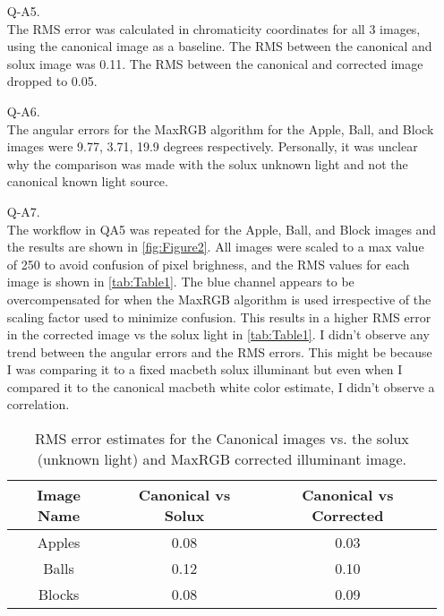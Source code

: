 \documentclass[12pt]{report}
\begin{document}
\begin{enumerate}
    \item[Q-A5.]
    \ \\
    The RMS error was calculated in chromaticity coordinates for all 3 images, using the canonical image as a baseline. The RMS between the canonical and solux 
    image was 0.11. The RMS between the canonical and corrected image dropped to 0.05.

    \item[Q-A6.]
    \ \\
    The angular errors for the MaxRGB algorithm for the Apple, Ball, and Block images were 9.77, 3.71, 19.9 degrees respectively. Personally, it was unclear why 
    the comparison was made with the solux unknown light and not the canonical known light source.

    \item[Q-A7.]
    \ \\
    The workflow in QA5 was repeated for the Apple, Ball, and Block images and the results are shown in \autoref{fig:Figure2}. All images were scaled to a max 
    value of 250 to avoid confusion of pixel brighness, and the RMS values for each image is shown in \autoref{tab:Table1}. The blue channel appears to be 
    overcompensated for when the MaxRGB algorithm is used irrespective of the scaling factor used to minimize confusion. This results in a higher RMS error in 
    the corrected image vs the solux light in \autoref{tab:Table1}. I didn't observe any trend between the angular errors and the RMS errors. This might be 
    because I was comparing it to a fixed macbeth solux illuminant but even when I compared it to the canonical macbeth white color estimate, I didn't observe 
    a correlation.

    \begin{table}[h!]
    \begin{center}
    \begin{tabular}{ | c | c | c | } 
        \hline
        Image Name & Canonical vs Solux & Canonical vs Corrected \\ 
        \hline \hline
        Apples & 0.08 & 0.03 \\ 
        Balls  & 0.12 & 0.10 \\ 
        Blocks & 0.08 & 0.09 \\
        \hline
    \end{tabular}
    \caption{RMS error estimates for the Canonical images vs. the solux (unknown light) and MaxRGB corrected illuminant image.}
    \label{tab:Table1}
    \end{center}
    \end{table}


\end{enumerate}
\end{document}
